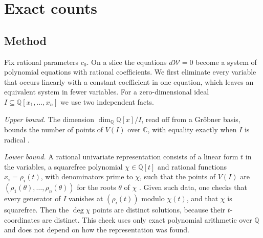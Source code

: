 \documentclass[11pt]{amsart}
\theoremstyle{definition}
\newcommand{\QQ}{\mathbb{Q}}
\newcommand{\CC}{\mathbb{C}}
\newcommand{\cW}{\mathcal W}
\begin{document}
\section{Exact counts}\label{sec:counts}

\subsection{Method}
Fix rational parameters $c_0$. On a slice the equations $d\cW=0$ become a system of polynomial equations with rational coefficients. We first eliminate every variable that occurs linearly with a constant coefficient in one equation, which leaves an equivalent system in fewer variables. For a zero-dimensional ideal $I\subseteq\QQ[x_1,\dots,x_n]$ we use two independent facts.

\emph{Upper bound.} The dimension $\dim_\QQ\QQ[x]/I$, read off from a Gröbner basis, bounds the number of points of $V(I)$ over $\CC$, with equality exactly when $I$ is radical \cite[Chapter~5]{CLO15}.

\emph{Lower bound.} A rational univariate representation consists of a linear form $t$ in the variables, a squarefree polynomial $\chi\in\QQ[t]$ and rational functions $x_i=\rho_i(t)$, with denominators prime to $\chi$, such that the points of $V(I)$ are $(\rho_1(\theta),\dots,\rho_n(\theta))$ for the roots $\theta$ of $\chi$ \cite{Rou99}. Given such data, one checks that every generator of $I$ vanishes at $(\rho_i(t))$ modulo $\chi(t)$, and that $\chi$ is squarefree. Then the $\deg\chi$ points are distinct solutions, because their $t$-coordinates are distinct. This check uses only exact polynomial arithmetic over $\QQ$ and does not depend on how the representation was found.
\end{document}
